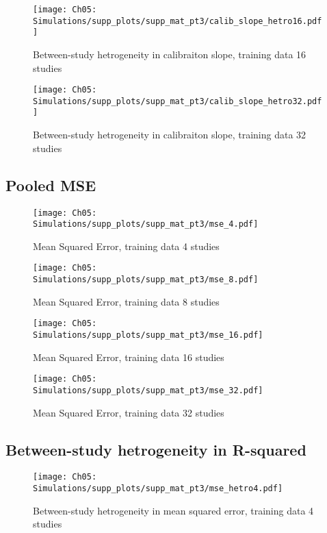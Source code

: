 \begin{figure}[H]
  \centering
  \texttt{[image: Ch05: Simulations/supp\_plots/supp\_mat\_pt3/calib\_slope\_hetro16.pdf]}
  \caption{Between-study hetrogeneity in calibraiton slope, training data 16 studies}
\end{figure}

\begin{figure}[H]
  \centering
  \texttt{[image: Ch05: Simulations/supp\_plots/supp\_mat\_pt3/calib\_slope\_hetro32.pdf]}
  \caption{Between-study hetrogeneity in calibraiton slope, training data 32 studies}
\end{figure}

\subsection{Pooled MSE}
\begin{figure}[H]
  \centering
  \texttt{[image: Ch05: Simulations/supp\_plots/supp\_mat\_pt3/mse\_4.pdf]}
  \caption{Mean Squared Error, training data 4 studies}
\end{figure}

\begin{figure}[H]
  \centering
  \texttt{[image: Ch05: Simulations/supp\_plots/supp\_mat\_pt3/mse\_8.pdf]}
  \caption{Mean Squared Error, training data 8 studies}
\end{figure}

\begin{figure}[H]
  \centering
  \texttt{[image: Ch05: Simulations/supp\_plots/supp\_mat\_pt3/mse\_16.pdf]}
  \caption{Mean Squared Error, training data 16 studies}
\end{figure}

\begin{figure}[H]
  \centering
  \texttt{[image: Ch05: Simulations/supp\_plots/supp\_mat\_pt3/mse\_32.pdf]}
  \caption{Mean Squared Error, training data 32 studies}
\end{figure}

\subsection{Between-study hetrogeneity in R-squared}
\begin{figure}[H]
  \centering
  \texttt{[image: Ch05: Simulations/supp\_plots/supp\_mat\_pt3/mse\_hetro4.pdf]}
  \caption{Between-study hetrogeneity in mean squared error, training data 4 studies}
\end{figure}

